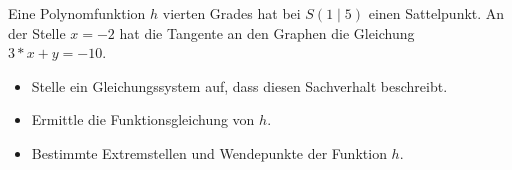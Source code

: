 
Eine Polynomfunktion $h$ vierten Grades hat bei $S(1 \mid 5)$ einen Sattelpunkt. An der
Stelle $x=-2$ hat die Tangente an den Graphen die Gleichung $3*x + y = -10$.

\begin{itemize}
	\item Stelle ein Gleichungssystem auf, dass diesen Sachverhalt beschreibt.
	\item Ermittle die Funktionsgleichung von $h$.
	\item Bestimmte Extremstellen und Wendepunkte der Funktion $h$.
\end{itemize}

